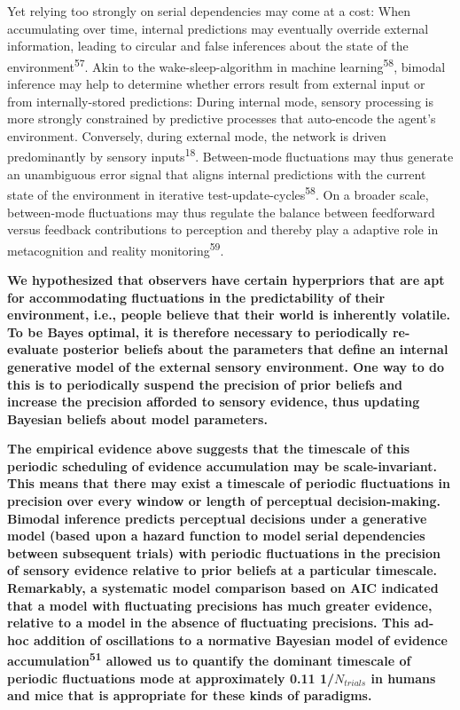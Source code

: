 \documentclass[
]{article}
\begin{document}
Yet relying too strongly on serial dependencies may come at a cost: When
accumulating over time, internal predictions may eventually override
external information, leading to circular and false inferences about the
state of the environment\textsuperscript{57}. Akin to the
wake-sleep-algorithm in machine learning\textsuperscript{58}, bimodal
inference may help to determine whether errors result from external
input or from internally-stored predictions: During internal mode,
sensory processing is more strongly constrained by predictive processes
that auto-encode the agent's environment. Conversely, during external
mode, the network is driven predominantly by sensory
inputs\textsuperscript{18}. Between-mode fluctuations may thus generate
an unambiguous error signal that aligns internal predictions with the
current state of the environment in iterative
test-update-cycles\textsuperscript{58}. On a broader scale, between-mode
fluctuations may thus regulate the balance between feedforward versus
feedback contributions to perception and thereby play a adaptive role in
metacognition and reality monitoring\textsuperscript{59}.

\textbf{We hypothesized that observers have certain hyperpriors that are
apt for accommodating fluctuations in the predictability of their
environment, i.e., people believe that their world is inherently
volatile. To be Bayes optimal, it is therefore necessary to periodically
re-evaluate posterior beliefs about the parameters that define an
internal generative model of the external sensory environment. One way
to do this is to periodically suspend the precision of prior beliefs and
increase the precision afforded to sensory evidence, thus updating
Bayesian beliefs about model parameters.}

\textbf{The empirical evidence above suggests that the timescale of this
periodic scheduling of evidence accumulation may be scale-invariant.
This means that there may exist a timescale of periodic fluctuations in
precision over every window or length of perceptual decision-making.
Bimodal inference predicts perceptual decisions under a generative model
(based upon a hazard function to model serial dependencies between
subsequent trials) with periodic fluctuations in the precision of
sensory evidence relative to prior beliefs at a particular timescale.
Remarkably, a systematic model comparison based on AIC indicated that a
model with fluctuating precisions has much greater evidence, relative to
a model in the absence of fluctuating precisions. This ad-hoc addition
of oscillations to a normative Bayesian model of evidence
accumulation\textsuperscript{51} allowed us to quantify the dominant
timescale of periodic fluctuations mode at approximately 0.11
1/\(N_{trials}\) in humans and mice that is appropriate for these kinds
of paradigms.}
\end{document}

